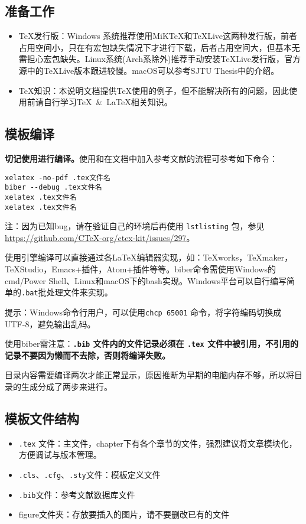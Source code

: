 \subsection{准备工作}
\begin{itemize}
  \item \TeX 发行版：Windows 系统推荐使用MiKTeX和\TeX Live这两种发行版，前者占用空间小，只在有宏包缺失情况下才进行下载，后者占用空间大，但基本无需担心宏包缺失。Linux系统(Arch系除外)推荐手动安装\TeX Live发行版，官方源中的TeXLive版本跟进较慢。macOS可以参考SJTU Thesis中的介绍。
  \item \TeX 知识：本说明文档提供\TeX 使用的例子，但不能解决所有的问题，因此使用前请自行学习\TeX~\&~\LaTeX 相关知识。
\end{itemize}

\subsection{模板编译}

\textbf{切记使用\XeLaTeX 进行编译。}使用\XeLaTeX 和在文档中加入参考文献的流程可参考如下命令：

\iffalse
\begin{lstlisting}[basicstyle=\small\ttfamily, caption=手动逐次编译, numbers=none]
xelatex -no-pdf .tex文件名
biber --debug .tex文件名
xelatex .tex文件名
xelatex .tex文件名
\end{lstlisting}
\else
\begin{verbatim}
xelatex -no-pdf .tex文件名
biber --debug .tex文件名
xelatex .tex文件名
xelatex .tex文件名
\end{verbatim}

注：因为已知bug，请在验证自己的环境后再使用 \texttt{lstlisting} 包，参见\url{https://github.com/CTeX-org/ctex-kit/issues/297}。

\fi

使用\XeLaTeX 引擎编译可以直接通过各\LaTeX 编辑器实现，如：TeXworks，TeXmaker，TeXStudio，Emacs+插件，Atom+插件等等。biber命令需使用Windows的cmd/Power Shell、Linux和macOS下的bash实现。Windows平台可以自行编写简单的\verb|.bat|批处理文件来实现。

提示：Windows命令行用户，可以使用\verb|chcp 65001| 命令，将字符编码切换成 UTF-8，避免输出乱码。

使用biber需注意：\textbf{\texttt{.bib} 文件内的文件记录必须在 \texttt{.tex} 文件中被引用，不引用的记录不要因为懒而不去除，否则将编译失败。}

目录内容需要编译两次才能正常显示，原因推断为早期的电脑内存不够，所以将目录的生成分成了两步来进行。

\subsection{模板文件结构}
\begin{itemize}[noitemsep,topsep=0pt,parsep=0pt,partopsep=0pt]
  \item \verb|.tex| 文件：主文件，chapter下有各个章节的文件，强烈建议将文章模块化，方便调试与版本管理。
  \item \verb|.cls|、\verb|.cfg|、\verb|.sty|文件：模板定义文件
  \item \verb|.bib|文件：参考文献数据库文件
  \item figure文件夹：存放要插入的图片，请不要删改已有的文件
\end{itemize}
